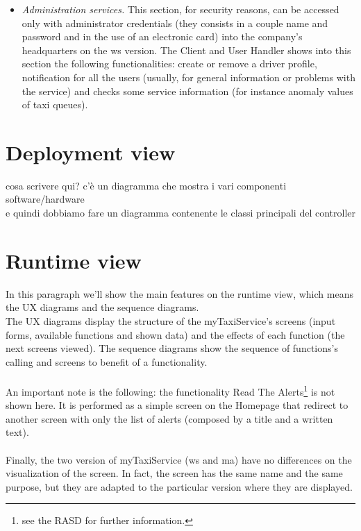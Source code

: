 \documentclass[\mainpath/main]{subfiles}
\begin{document}
\begin{itemize}
	\item \textit{Administration services.} This section, for security reasons, can be accessed only with administrator credentials (they consists in a couple name and password and in the use of an electronic card) into the company's headquarters on the \gls{ws} version. The Client and User Handler shows into this section the following functionalities: create or remove a driver profile, notification for all the users (usually, for general information or problems with the service) and checks some service information (for instance anomaly values of taxi queues).
\end{itemize}


\section{Deployment view}
\label{ArchitecturalDesign:deploy}

cosa scrivere qui? c'è un diagramma che mostra i vari componenti software/hardware\\
e quindi dobbiamo fare un diagramma contenente le classi principali del controller

\section{Runtime view}
\label{ArchitecturalDesign:runtime}

In this paragraph we'll show the main features on the runtime view, which means the UX diagrams and the sequence diagrams.\\
The UX diagrams display the structure of the myTaxiService's screens (input forms, available functions and shown data) and the effects of each function (the next screens viewed). The sequence diagrams show the sequence of functions's calling and screens to benefit of a functionality.\\
\\
An important note is the following: the functionality Read The Alerts\footnote{see the RASD for further information.} is not shown here. It is performed as a simple screen on the Homepage that redirect to another screen with only the list of alerts (composed by a title and a written text).\\
\\
Finally, the two version of myTaxiService (\gls{ws} and \gls{ma}) have no differences on the visualization of the screen. In fact, the screen has the same name and the same purpose, but they are adapted to the particular version where they are displayed.\\
\end{document}
